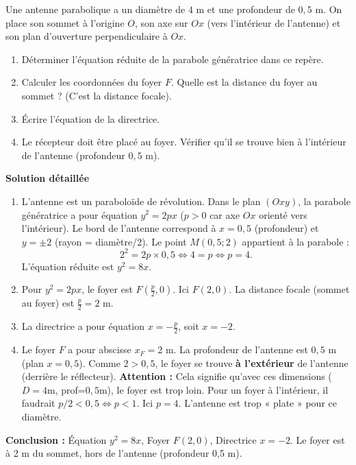 \documentclass[11pt]{article}
\begin{document}
\begin{exoresolu}
Une antenne parabolique a un diamètre de $4$ m et une profondeur de $0,5$ m. On place son sommet à l'origine $O$, son axe sur $Ox$ (vers l'intérieur de l'antenne) et son plan d'ouverture perpendiculaire à $Ox$.
\begin{enumerate}
    \item Déterminer l'équation réduite de la parabole génératrice dans ce repère.
    \item Calculer les coordonnées du foyer $F$. Quelle est la distance du foyer au sommet ? (C'est la distance focale).
    \item Écrire l'équation de la directrice.
    \item Le récepteur doit être placé au foyer. Vérifier qu'il se trouve bien à l'intérieur de l'antenne (profondeur $0,5$ m).
\end{enumerate}
\tcblower
\textbf{Solution détaillée}
\begin{enumerate}
    \item L'antenne est un paraboloïde de révolution. Dans le plan $(Oxy)$, la parabole génératrice a pour équation $y^2 = 2px$ ($p>0$ car axe $Ox$ orienté vers l'intérieur).
    Le bord de l'antenne correspond à $x = 0,5$ (profondeur) et $y = \pm 2$ (rayon = diamètre/2).
    Le point $M(0,5 ; 2)$ appartient à la parabole :
    \[ 2^2 = 2p \times 0,5 \iff 4 = p \iff p = 4. \]
    L'équation réduite est \textbf{$y^2 = 8x$}.
    \item Pour $y^2 = 2px$, le foyer est $F(\frac{p}{2}, 0)$. Ici $F(2, 0)$.
    La distance focale (sommet au foyer) est $\frac{p}{2} = 2$ m.
    \item La directrice a pour équation $x = -\frac{p}{2}$, soit \textbf{$x = -2$}.
    \item Le foyer $F$ a pour abscisse $x_F = 2$ m. La profondeur de l'antenne est $0,5$ m (plan $x=0,5$).
    Comme $2 > 0,5$, le foyer se trouve \textbf{à l'extérieur} de l'antenne (derrière le réflecteur).
    \textbf{Attention :} Cela signifie qu'avec ces dimensions ($D=4$m, prof=$0,5$m), le foyer est trop loin. Pour un foyer à l'intérieur, il faudrait $p/2 < 0,5 \iff p < 1$. Ici $p=4$. L'antenne est trop « plate » pour ce diamètre.
\end{enumerate}
\textbf{Conclusion :} Équation $y^2=8x$, Foyer $F(2,0)$, Directrice $x=-2$. Le foyer est à 2 m du sommet, hors de l'antenne (profondeur 0,5 m).
\end{exoresolu}
\end{document}
